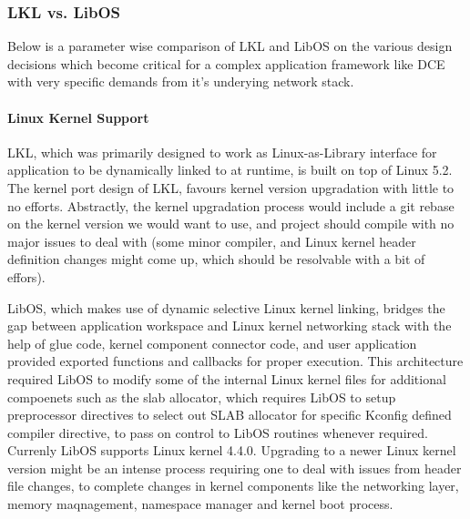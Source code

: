 \documentclass{sig-alternate}
\begin{document}
\subsubsection{LKL vs. LibOS}
Below is a parameter wise comparison of LKL and LibOS on the various design decisions which become critical for a complex application framework like 
DCE with very specific demands from it's underying network stack.

\paragraph{Linux Kernel Support}
LKL, which was primarily designed to work as Linux-as-Library interface for application to be dynamically linked to at runtime, is built on top of 
Linux 5.2. The kernel port design of LKL, favours kernel version upgradation with little to no efforts. Abstractly, the kernel upgradation process 
would include a git rebase on the kernel version we would want to use, and project should compile with no major issues to deal with (some minor compiler, 
and Linux kernel header definition changes might come up, which should be resolvable with a bit of effors).

LibOS, which makes use of dynamic selective Linux kernel linking, bridges the gap between application workspace and Linux kernel networking stack with
the help of glue code, kernel component connector code, and user application provided exported functions and callbacks for proper execution. This
architecture required LibOS to modify some of the internal Linux kernel files for additional compoenets such as the slab allocator, which requires 
LibOS to setup preprocessor directives to select out SLAB allocator for specific Kconfig defined compiler directive, to pass on control to LibOS routines 
whenever required. Currenly LibOS supports Linux kernel 4.4.0. Upgrading to a newer Linux kernel version might be an intense process requiring one 
to deal with issues from header file changes, to complete changes in kernel components like the networking layer, memory maqnagement, namespace manager 
and kernel boot process.
\end{document}
